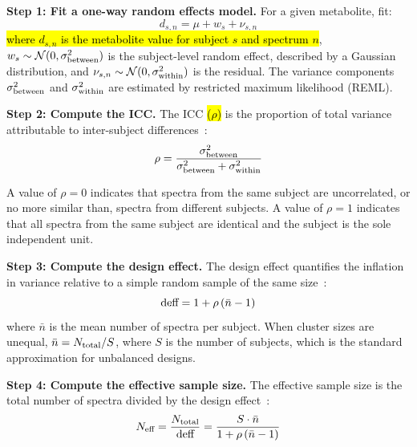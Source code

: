 \textbf{Step 1: Fit a one-way random effects model.} For a given metabolite, fit:
\begin{equation}\label{eqn:random_effects_icc}
    d_{s,n} = \mu + w_s + \nu_{s,n}
\end{equation}
\noindent \hl{where $d_{s,n}$ is the metabolite value for subject $s$ and spectrum $n$}, $w_s \sim \mathcal{N}(0, \sigma^2_{\textnormal{between}})$ is the subject-level random effect, described by a Gaussian distribution, and $\nu_{s,n} \sim \mathcal{N}(0, \sigma^2_{\textnormal{within}})$ is the residual. The variance components $\sigma^2_{\textnormal{between}}$ and $\sigma^2_{\textnormal{within}}$ are estimated by restricted maximum likelihood (REML).

\textbf{Step 2: Compute the ICC.} The ICC \hl{($\rho$)} is the proportion of total variance attributable to inter-subject differences~\cite{Shrout1979}:
\begin{equation}\label{eqn:icc}
    \rho = \frac{\sigma^2_{\textnormal{between}}}
                {\sigma^2_{\textnormal{between}} +
                 \sigma^2_{\textnormal{within}}}
\end{equation}

A value of $\rho = 0$ indicates that spectra from the same subject are uncorrelated, or no more similar than, spectra from different subjects. A value of $\rho = 1$ indicates that all spectra from the same subject are identical and the subject is the sole independent unit.

\textbf{Step 3: Compute the design effect.} The design effect quantifies the inflation in variance relative to a simple random sample of the same size~\cite{Kish1965}:
\begin{equation}\label{eqn:deff}
    \textnormal{deff} = 1 + \rho\,(\bar{n} - 1)
\end{equation}
\noindent where $\bar{n}$ is the mean number of spectra per subject. When cluster sizes are unequal, $\bar{n} = N_{\textnormal{total}} / S$, where $S$ is the number of subjects, which is the standard
approximation for unbalanced designs.

\textbf{Step 4: Compute the effective sample size.} The effective sample size is the total number of spectra divided by the design effect~\cite{Kish1965}:
\begin{equation}\label{eqn:neff}
    N_{\textnormal{eff}} = \frac{N_{\textnormal{total}}}{\textnormal{deff}}
                     = \frac{S \cdot \bar{n}}
                            {1 + \rho\,(\bar{n} - 1)}
\end{equation}

